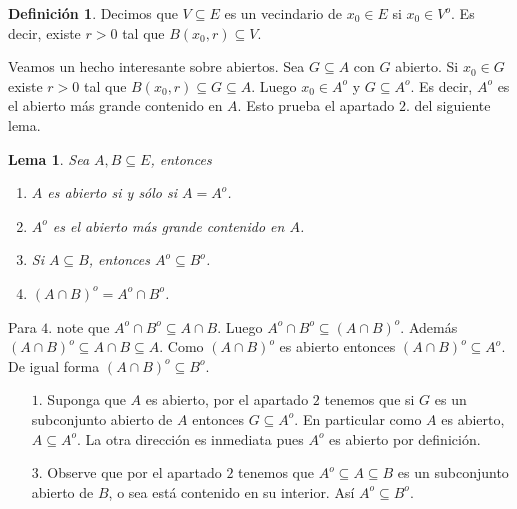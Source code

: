 \documentclass[12pt]{article}
\theoremstyle{plain}
\newtheorem{Lem}[Th]{Lema}             %
\theoremstyle{definition}
\newtheorem{Def}[Th]{Definición}       %
\theoremstyle{remark}
\numberwithin{equation}{section}
\renewcommand{\:}{\colon}           %
\begin{document}
\begin{multicols}{2}
\begin{Def}\label{dvecindario1}
  Decimos que $V\subseteq E$ es un vecindario de $x_0\in E$ si $x_0\in V^o$. Es decir, existe $r>0$ tal que $B(x_0,r)\subseteq V$.
\end{Def}

Veamos un hecho interesante sobre abiertos. Sea $G\subseteq A$ con $G$ abierto. Si $x_0\in G$ existe $r>0$ tal que $B(x_0,r)\subseteq G\subseteq A$. Luego $x_0\in A^o$ y $G\subseteq A^o$. Es decir, $A^o$ es el abierto más grande contenido en $A$. Esto prueba el apartado $\mathit{2}.$ del siguiente lema.

\begin{Lem}
  Sea $A,B\subseteq E$, entonces
  \begin{enumerate}
    \item $A$ es abierto si y sólo si $A=A^o$.
    \item $A^o$ es el abierto más grande contenido en $A$.
    \item Si $A\subseteq B$, entonces $A^o\subseteq B^o$.
    \item $(A\cap B)^o=A^o\cap B^o$.
  \end{enumerate}
\end{Lem}

\begin{ptcbp}
Para $\mathit{4}.$ note que $A^o\cap B^o\subseteq A\cap B$. Luego $A^o\cap B^o\subseteq (A\cap B)^o$. Además $(A\cap B)^o\subseteq A\cap B\subseteq A$. Como $(A\cap B)^o$ es abierto entonces $(A\cap B)^o\subseteq A^o$. De igual forma $(A\cap B)^o\subseteq B^o$.
\end{ptcbp}

\begin{ptcb}
\begin{enumerate}
  \item[$\mathit 1$.] Suponga que $A$ es abierto, por el apartado $\mathit{2}$ tenemos que si $G$ es un subconjunto abierto de $A$ entonces $G\subseteq A^o$. En particular como $A$ es abierto, $A\subseteq A^o$. La otra dirección es inmediata pues $A^o$ es abierto por definición.
  \item[$\mathit 3$.] Observe que por el apartado $\mathit{2}$ tenemos que $A^o\subseteq A\subseteq B$ es un subconjunto abierto de $B$, o sea está contenido en su interior. Así $A^o\subseteq B^o$.
\end{enumerate}
\end{ptcb}


\end{multicols}
\end{document}
